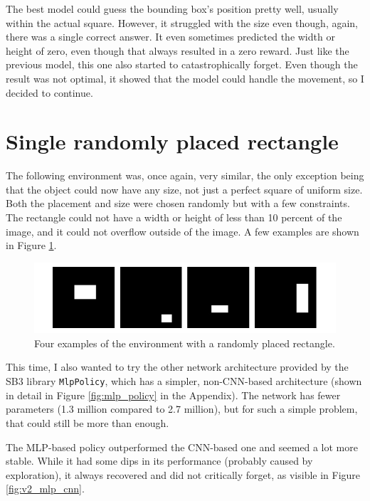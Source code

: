\documentclass[
  digital,     %
  oneside,     %
  nosansbold,  %
  nocolorbold, %
  lof,         %
  lot,         %
]{fithesis4}
\begin{document}
The best model could guess the bounding box's position pretty well, usually within the actual square. However, it struggled with the size even though, again, there was a single correct answer. It even sometimes predicted the width or height of zero, even though that always resulted in a zero reward. Just like the previous model, this one also started to catastrophically forget. Even though the result was not optimal, it showed that the model could handle the movement, so I decided to continue.

\section{Single randomly placed rectangle}
\label{sec:moving_rectangle}
The following environment was, once again, very similar, the only exception being that the object could now have any size, not just a perfect square of uniform size. Both the placement and size were chosen randomly but with a few constraints. The rectangle could not have a width or height of less than 10 percent of the image, and it could not overflow outside of the image. A few examples are shown in Figure \ref{fig:env2}.

\begin{figure}
    \includegraphics[width=1\linewidth]{env_examples/env2.pdf}
    \caption{Four examples of the environment with a randomly placed rectangle.}
    \label{fig:env2}
\end{figure}

This time, I also wanted to try the other network architecture provided by the SB3 library \texttt{MlpPolicy}, which has a simpler, non-CNN-based architecture (shown in detail in Figure \ref{fig:mlp_policy} in the Appendix). The network has fewer parameters (1.3 million compared to 2.7 million), but for such a simple problem, that could still be more than enough.

The MLP-based policy outperformed the CNN-based one and seemed a lot more stable. While it had some dips in its performance (probably caused by exploration), it always recovered and did not critically forget, as visible in Figure \ref{fig:v2_mlp_cnn}.
\end{document}

